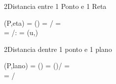\documentclass[\mainfilename]{subfiles}
\begin{document}
\begin{sectionBox}2{Distancia entre 1 Ponto e 1 Reta}
    \begin{BM}
        \distancia(P,eta)
    =   \Bigl{}\Bigr\rVert\sin(\theta)
    =   \Bigl{}\Bigr\rVert{}\rVert\sin{\theta}/\rVert
    = \\
    =   \Bigl{}\Bigr\rVert\big/\rVert:
        \theta = \measuredangle\Bigl(u,\Bigr)
    \end{BM}
\end{sectionBox}

\begin{sectionBox}2{Distancia dentre 1 ponto e 1 plano}
    \begin{BM}
        \distancia(P,lano)
    =   \Bigl{}\Bigr\rVert\lvert\cos(\theta)\rvert
    =   \Bigl{}\Bigr\rVert{}\rVert\lvert\cos(\theta)\rvert\big/\rVert
    = \\
    =   \Bigl{}\Bigr\rvert\big/\rVert
    \end{BM}
\end{sectionBox}
\end{document}
